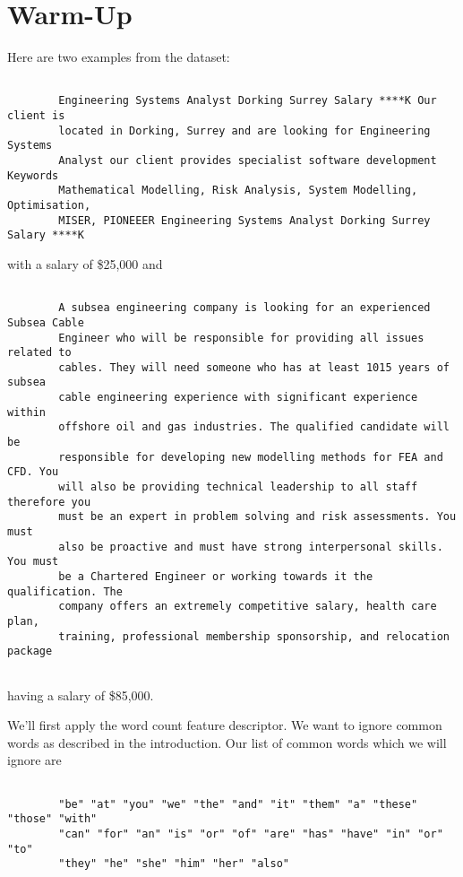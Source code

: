\documentclass[12pt]{article}
\begin{document}
\section{Warm-Up}

    Here are two examples from the dataset:
    \begin{lstlisting}

        Engineering Systems Analyst Dorking Surrey Salary ****K Our client is
        located in Dorking, Surrey and are looking for Engineering Systems
        Analyst our client provides specialist software development Keywords
        Mathematical Modelling, Risk Analysis, System Modelling, Optimisation,
        MISER, PIONEEER Engineering Systems Analyst Dorking Surrey Salary ****K

    \end{lstlisting}

    with a salary of \$25,000 and 

    \begin{lstlisting}

        A subsea engineering company is looking for an experienced Subsea Cable
        Engineer who will be responsible for providing all issues related to
        cables. They will need someone who has at least 1015 years of subsea
        cable engineering experience with significant experience within
        offshore oil and gas industries. The qualified candidate will be
        responsible for developing new modelling methods for FEA and CFD. You
        will also be providing technical leadership to all staff therefore you
        must be an expert in problem solving and risk assessments. You must
        also be proactive and must have strong interpersonal skills. You must
        be a Chartered Engineer or working towards it the qualification. The
        company offers an extremely competitive salary, health care plan,
        training, professional membership sponsorship, and relocation package
    
    \end{lstlisting} having a salary of \$85,000.

    We'll first apply the word count feature descriptor. We want to ignore
    common words as described in the introduction. Our list of common words
    which we will ignore are

    \begin{centering}
        \begin{lstlisting}

        "be" "at" "you" "we" "the" "and" "it" "them" "a" "these" "those" "with"
        "can" "for" "an" "is" "or" "of" "are" "has" "have" "in" "or" "to"
        "they" "he" "she" "him" "her" "also"

        \end{lstlisting}
    \end{centering}
    
\end{document}
